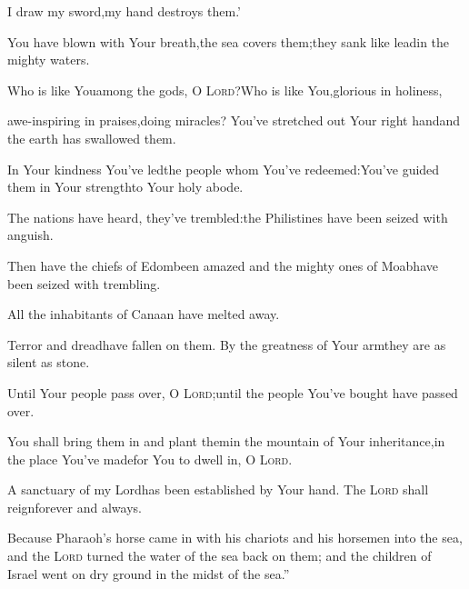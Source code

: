 \begin{inparaenum}
  \pb I draw my sword,\pa my hand destroys them.'%
  
  \pa {} You have blown with Your breath,\pa the sea covers them;\pa they sank like lead\pa in the mighty waters.%
  
  \pa {} Who is like You\pa among the gods, O \textsc{Lord}?\pa Who is like You,\pa glorious in holiness,%
  
  \pb awe-inspiring in praises,\pa doing miracles?%
  \pa {} You've stretched out Your right hand\pa and the earth has swallowed them.%
  
  \pa {} In Your kindness You've led\pa the people whom You've redeemed:\pa You've guided them%
  in Your strength\pa to Your holy abode.%
  
  \pa {} The nations%
  have heard, they've trembled:\pa the Philistines have been seized with anguish.%
  
  \pa {} Then have the chiefs of Edom\pa been amazed%
  \pa and the mighty ones of Moab\pa have been seized with trembling.%
  
  \pb All the inhabitants of Canaan have melted away.%
  
  \pa {} Terror and dread\pa have fallen on them.%
  \pa By the greatness of Your arm\pa they are as silent as stone.%
  
  \pb Until Your people pass over, O \textsc{Lord};\pa until the people You've bought have passed over.%
  
  \pa {} You shall bring them in and plant them\pa in the mountain of Your inheritance,\pa in the place You've made\pa for You to dwell in, O \textsc{Lord}.%
  
  \pb A sanctuary of my Lord\pa has been established by Your hand.\pa {} The \textsc{Lord} shall reign\pa forever and always.%
  
   Because Pharaoh's horse came in with his chariots and his horsemen into the sea, and the \textsc{Lord} turned the water of the sea back on them; and the children of Israel went on dry ground in the midst of the sea.''%
  

\end{inparaenum}
